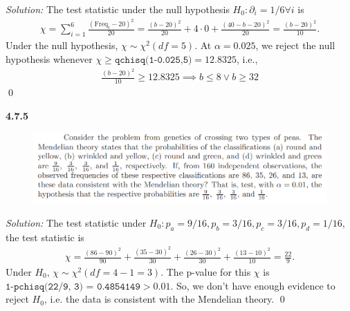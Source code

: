 \documentclass{book}
\theoremstyle{definition}
\newcommand{\p}{\partial}
\newcommand{\f}[2]{\frac{#1}{#2}}
\begin{document}
\noindent \textit{Solution:} The test statistic under the null hypothesis $H_0: \p_i = 1/6 \forall i$ is 
\begin{align}
\chi = \sum^6_{i=1}\f{(\text{Freq}_i - 20)^2}{20} = \f{(b-20)^2}{20} + 4\cdot 0 + \f{(40-b-20)^2}{20}=\f{(b-20)^2}{10}.
\end{align}
Under the null hypothesis, $\chi \sim \chi^2(df = 5)$. At $\alpha = 0.025$, we reject the null hypothesis whenever $\chi \geq \texttt{qchisq(1-0.025,5)} = 12.8325$, i.e.,
\begin{align}
\f{(b-20)^2}{10} \geq 12.8325 \implies \boxed{b \leq 8 \lor b \geq  32}
\end{align}
\qed


















\newpage
\noindent\textbf{4.7.5} 
\begin{figure}[!htb]
	\centering
	\includegraphics[scale=0.5]{475}
\end{figure}



\noindent \textit{Solution:} The test statistic under $H_0: p_a = 9/16, p_b = 3/16, p_c = 3/16, p_d = 1/16$, the test statistic is
\begin{align}
\chi = \f{(86 - 90)^2}{90} + \f{(35- 30)^2}{30} + \f{(26-30)^2}{30} + \f{(13 -10)^2}{10} = \f{22}{9}.
\end{align}
Under $H_0$, $\chi \sim \chi^2(df = 4-1 = 3)$. The p-value for this $\chi$ is $\texttt{1-pchisq(22/9, 3) = 0.4854149} > 0.01$. So, we don't have enough evidence to reject $H_0$, i.e. the data is consistent with the Mendelian theory. \qed
\end{document}
